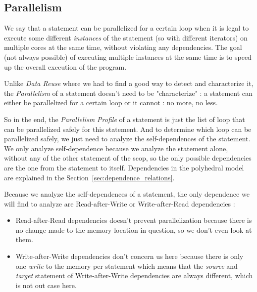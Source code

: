 \documentclass[paper=a4, fontsize=11.5pt]{scrartcl}
\numberwithin{equation}{section}        %
\numberwithin{figure}{section}          %
\numberwithin{table}{section}               %
\begin{document}
    \subsection{Parallelism}
        We say that a statement can be parallelized for a certain loop when it is legal to
        execute some different \textit{instances} of the statement (so with different iterators)
        on multiple cores at the same time, without violating any dependencies. The
        goal (not always possible) of executing multiple instances at the same time is to
        speed up the overall execution of the program.

        Unlike \textit{Data Reuse} where we had to find a good way to detect and characterize it,
        the \textit{Parallelism} of a statement doesn't need to be "characterize" :
        a statement can either be parallelized for a certain loop or it cannot : no more, no less.

        So in the end, the \textit{Parallelism Profile} of a statement is just the list
        of loop that can be parallelized safely for this statement.
        And to determine which loop can be parallelized safely, we just need to analyze
        the \glspl{self-dependence} of the statement. We only analyze \gls{self-dependence}
        because we analyze the statement alone, without any of the other statement of
        the scop, so the only possible dependencies are the one from the statement to itself.
        Dependencies in the polyhedral model are explained in the Section~\ref{sec:dependence_relations}.
       
        \bigskip

        Because we analyze the \glspl{self-dependence} of a statement, the only
        dependence we will find to analyze are Read-after-Write or Write-after-Read dependencies :
        \begin{itemize}
            \item Read-after-Read dependencies doesn't prevent parallelization because there is no
                change made to the memory location in question, so we don't even look at them.
        
            \item Write-after-Write dependencies don't concern us here because there is
                only one \textit{write} to the memory per statement which means that
                the \textit{source} and \textit{target} statement of Write-after-Write
                dependencies are always different, which is not out case here.
        \end{itemize}
        
\end{document}
